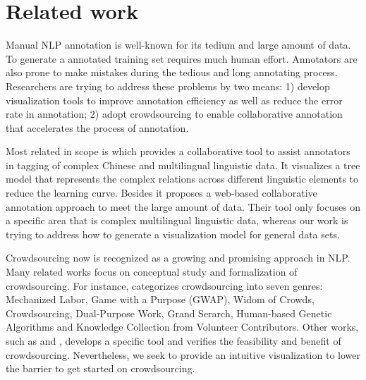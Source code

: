 \section{Related work}

Manual NLP annotation is well-known for its tedium and large amount of
data. To generate a annotated training set requires much human effort.
Annotators are also prone to make mistakes during the tedious and long
annotating process. Researchers are trying to address these problems
by two means: 1) develop visualization tools to improve annotation
efficiency as well as reduce the error rate in annotation; 2) adopt
crowdsourcing to enable collaborative annotation that accelerates the
process of annotation.

Most related in scope is \cite{yan2012collaborative} which provides a
collaborative tool to assist annotators in tagging of complex Chinese
and multilingual linguistic data. It visualizes a tree model that
represents the complex relations across different linguistic elements
to reduce the learning curve. Besides it proposes a web-based
collaborative annotation approach to meet the large amount of data.
Their tool only focuses on a specific area that is complex
multilingual linguistic data, whereas our work is trying to address
how to generate a visualization model for general data sets.

Crowdsourcing now is recognized as a growing and promising approach in
NLP. Many related works focus on conceptual study and formalization of
crowdsourcing. For instance, \cite{quinn2009taxonomy} categorizes
crowdsourcing into seven genres: Mechanized Labor, Game with a Purpose
(GWAP), Widom of Crowds, Crowdsourcing, Dual-Purpose Work, Grand
Serarch, Human-based Genetic Algorithms and Knowledge Collection from
Volunteer Contributors. Other works, such as
\cite{abekawa2010community} and \cite{irvine2010using}, develops a
specific tool and verifies the feasibility and benefit of
crowdsourcing. Nevertheless, we seek to provide an intuitive
visualization to lower the barrier to get started on crowdsourcing. 


